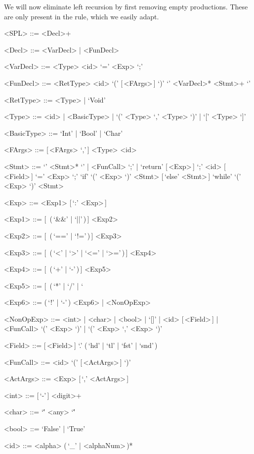 \documentclass{article}
\begin{document}
We will now eliminate left recursion by first removing empty productions.
These are only present in the  rule, which we easily adapt.
\begin{grammar}
    <SPL> ::= <Decl>+

    <Decl> ::= <VarDecl> | <FunDecl>

    <VarDecl> ::= <Type> <id> `=' <Exp> `;'

    <FunDecl> ::= <RetType> <id> `(' [\,<FArgs>\,] `)' `{' <VarDecl>* <Stmt>+ `}'

    <RetType> ::= <Type> | `Void'

    <Type> ::= <id> | <BasicType> | `(' <Type> `,' <Type> `)' | `[' <Type> `]'

    <BasicType> ::= `Int' | `Bool' | `Char'

    <FArgs> ::= [\,<FArgs> `,'\,] <Type> <id>

    <Stmt> ::= `{' <Stmt>* `}' | <FunCall> `;' | `return' [\,<Exp>\,] `;'
    \alt <id> [\,<Field>\,] `=' <Exp> `;'
    \alt `if' `(' <Exp> `)' <Stmt> [\,`else' <Stmt>\,]
    \alt `while' `(' <Exp> `)' <Stmt>

    <Exp> ::= <Exp1> [\,`:' <Exp>\,]

    <Exp1> ::= [\,<Exp1> (\,`&&' | `||'\,)\,] <Exp2>

    <Exp2> ::= [\,<Exp2> (\,`==' | `!='\,)\,] <Exp3>

    <Exp3> ::= [\,<Exp3> (\,`<' | `>' | `<=' | `>='\,)\,] <Exp4>

    <Exp4> ::= [\,<Exp4> (\,`+' | `-'\,)\,] <Exp5>

    <Exp5> ::= [\,<Exp5> (\,`*' | `/' | `%

    <Exp6> ::= (\,`!' | `-'\,) <Exp6> | <NonOpExp>

    <NonOpExp> ::= <int> | <char> | <bool> | `[]' | <id> [\,<Field>\,] | <FunCall>
    \alt `(' <Exp> `)' | `(' <Exp> `,' <Exp> `)'

    <Field> ::= [\,<Field>\,] `.' (\,`hd' | `tl' | `fst' | `snd'\,)

    <FunCall> ::= <id> `(' [\,<ActArgs>\,] `)'

    <ActArgs> ::= <Exp> [\,`,' <ActArgs>\,]

    <int> ::= [\,`-'\,] <digit>+

    <char> ::= `\'' <any> `\''

    <bool> ::= `False' | `True'

    <id> ::= <alpha> (\,`_' | <alphaNum>\,)*
\end{grammar}
\end{document}
